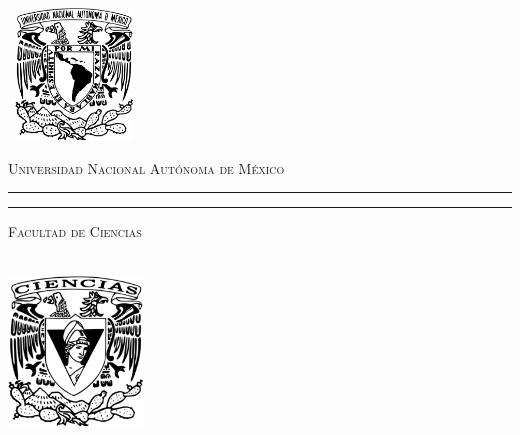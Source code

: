 \begin{titlepage}
	\thispagestyle{empty}
	\begin{minipage}[c][0.17\textheight][c]{0.25\textwidth}
		\begin{center}
			\includegraphics[width=3.5cm, height=3.5cm]{resources/Logo_UNAM.png}
		\end{center}
	\end{minipage}
	\begin{minipage}[c][0.195\textheight][t]{0.75\textwidth}
		\begin{center}
			\vspace{0.3cm}
			\textsc{\large Universidad Nacional Aut\'onoma de M\'exico}\\[0.5cm]
			\vspace{0.3cm}
			\hrule height2.5pt
			\vspace{.2cm}
			\hrule height1pt
			\vspace{.8cm}
			\textsc{Facultad de Ciencias}\\[0.5cm] %
		\end{center}
	\end{minipage}
	
	\begin{minipage}[c][0.81\textheight][t]{0.25\textwidth}
		\vspace*{5mm}
		\begin{center}
			\hskip2.0mm
			\vrule width1pt height13cm 
			\vspace{5mm}
			\hskip2pt
			\vrule width2.5pt height13cm
			\hskip2mm
			\vrule width1pt height13cm \\
			\vspace{5mm}
			\includegraphics[height=4.0cm]{resources/Logo_FC.png}
		\end{center}
	\end{minipage}
	\begin{minipage}[c][0.81\textheight][t]{0.75\textwidth}
		\begin{center}
			\vspace{1cm}
			

\end{center}
\end{minipage}
\end{titlepage}
